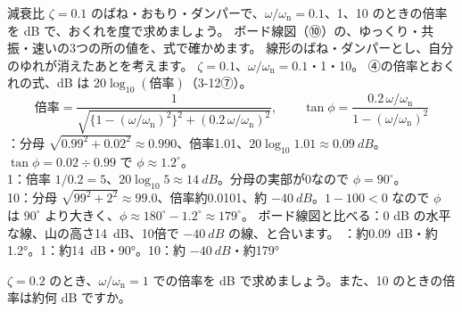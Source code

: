 \label{ph:波-2:ex10}
\begin{phreidai}[ボード線図の値を読む]
減衰比 $\zeta=0.1$ のばね・おもり・ダンパーで、$\omega/\omega_{\mathrm n}=0.1$、1、10 のときの倍率を dB で、おくれを度で求めましょう。
\phbamen
ボード線図（⑩）の、ゆっくり・共振・速いの3つの所の値を、式で確かめます。
\phmushi
線形のばね・ダンパーとし、自分のゆれが消えたあとを考えます。
\phzu
$\zeta=0.1$、$\omega/\omega_{\mathrm n}=0.1$・1・10。
\phriyu
④の倍率とおくれの式、dB は $20\log_{10}(\text{倍率})$（3-12⑦）。
\phtateru
\[\text{倍率}=\frac{1}{\sqrt{\{1-(\omega/\omega_{\mathrm n})^2\}^2+(0.2\,\omega/\omega_{\mathrm n})^2}},\qquad \tan\phi=\frac{0.2\,\omega/\omega_{\mathrm n}}{1-(\omega/\omega_{\mathrm n})^2}\]
：分母 $\sqrt{0.99^2+0.02^2}\approx0.990$、倍率1.01、$20\log_{10}1.01\approx\qty{0.09}{dB}$。$\tan\phi=0.02\div0.99$ で $\phi\approx1.2^\circ$。\\
1：倍率 $1/0.2=5$、$20\log_{10}5\approx\qty{14}{dB}$。分母の実部が0なので $\phi=90^\circ$。\\
10：分母 $\sqrt{99^2+2^2}\approx99.0$、倍率約0.0101、約 $\qty{-40}{dB}$。$1-100<0$ なので $\phi$ は $90^\circ$ より大きく、$\phi\approx180^\circ-1.2^\circ\approx179^\circ$。
\phtashikame
ボード線図と比べる：0 dB の水平な線、山の高さ\qty{14}{dB}、10倍で $\qty{-40}{dB}$ の線、と合います。
：約\qty{0.09}{dB}・約1.2°。1：約\qty{14}{dB}・90°。10：約 $\qty{-40}{dB}$・約179°
\end{phreidai}
\begin{jibun}
$\zeta=0.2$ のとき、$\omega/\omega_{\mathrm n}=1$ での倍率を dB で求めましょう。また、10 のときの倍率は約何 dB ですか。
\end{jibun}

